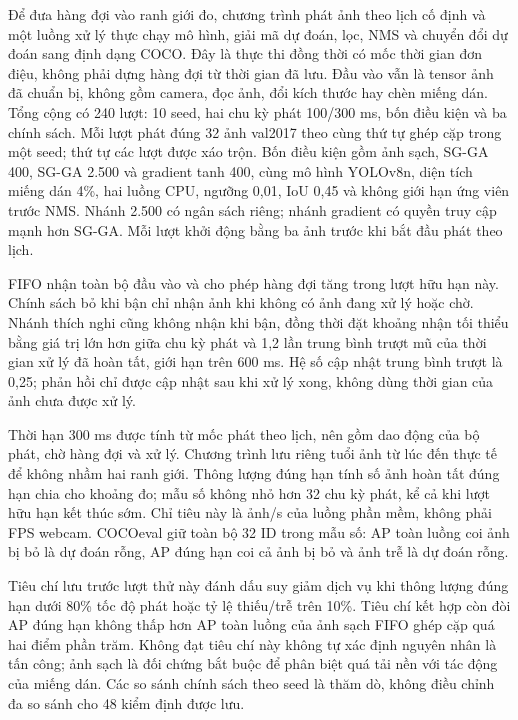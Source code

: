 \documentclass[a4paper,fleqn]{cas-dc}
\begin{document}
Để đưa hàng đợi vào ranh giới đo, chương trình phát ảnh theo lịch cố định và một luồng xử lý thực chạy mô hình, giải mã dự đoán, lọc, NMS và chuyển đổi dự đoán sang định dạng COCO. Đây là thực thi đồng thời có mốc thời gian đơn điệu, không phải dựng hàng đợi từ thời gian đã lưu. Đầu vào vẫn là tensor ảnh đã chuẩn bị, không gồm camera, đọc ảnh, đổi kích thước hay chèn miếng dán. Tổng cộng có 240 lượt: 10 seed, hai chu kỳ phát 100/300 ms, bốn điều kiện và ba chính sách. Mỗi lượt phát đúng 32 ảnh val2017 theo cùng thứ tự ghép cặp trong một seed; thứ tự các lượt được xáo trộn. Bốn điều kiện gồm ảnh sạch, SG-GA 400, SG-GA 2.500 và gradient tanh 400, cùng mô hình YOLOv8n, diện tích miếng dán 4\%, hai luồng CPU, ngưỡng 0,01, IoU 0,45 và không giới hạn ứng viên trước NMS. Nhánh 2.500 có ngân sách riêng; nhánh gradient có quyền truy cập mạnh hơn SG-GA. Mỗi lượt khởi động bằng ba ảnh trước khi bắt đầu phát theo lịch.

FIFO nhận toàn bộ đầu vào và cho phép hàng đợi tăng trong lượt hữu hạn này. Chính sách bỏ khi bận chỉ nhận ảnh khi không có ảnh đang xử lý hoặc chờ. Nhánh thích nghi cũng không nhận khi bận, đồng thời đặt khoảng nhận tối thiểu bằng giá trị lớn hơn giữa chu kỳ phát và 1,2 lần trung bình trượt mũ của thời gian xử lý đã hoàn tất, giới hạn trên 600 ms. Hệ số cập nhật trung bình trượt là 0,25; phản hồi chỉ được cập nhật sau khi xử lý xong, không dùng thời gian của ảnh chưa được xử lý.

Thời hạn 300 ms được tính từ mốc phát theo lịch, nên gồm dao động của bộ phát, chờ hàng đợi và xử lý. Chương trình lưu riêng tuổi ảnh từ lúc đến thực tế để không nhầm hai ranh giới. Thông lượng đúng hạn tính số ảnh hoàn tất đúng hạn chia cho khoảng đo; mẫu số không nhỏ hơn 32 chu kỳ phát, kể cả khi lượt hữu hạn kết thúc sớm. Chỉ tiêu này là ảnh/s của luồng phần mềm, không phải FPS webcam. COCOeval giữ toàn bộ 32 ID trong mẫu số: AP toàn luồng coi ảnh bị bỏ là dự đoán rỗng, AP đúng hạn coi cả ảnh bị bỏ và ảnh trễ là dự đoán rỗng.

Tiêu chí lưu trước lượt thử này đánh dấu suy giảm dịch vụ khi thông lượng đúng hạn dưới 80\% tốc độ phát hoặc tỷ lệ thiếu/trễ trên 10\%. Tiêu chí kết hợp còn đòi AP đúng hạn không thấp hơn AP toàn luồng của ảnh sạch FIFO ghép cặp quá hai điểm phần trăm. Không đạt tiêu chí này không tự xác định nguyên nhân là tấn công; ảnh sạch là đối chứng bắt buộc để phân biệt quá tải nền với tác động của miếng dán. Các so sánh chính sách theo seed là thăm dò, không điều chỉnh đa so sánh cho 48 kiểm định được lưu.
\end{document}
